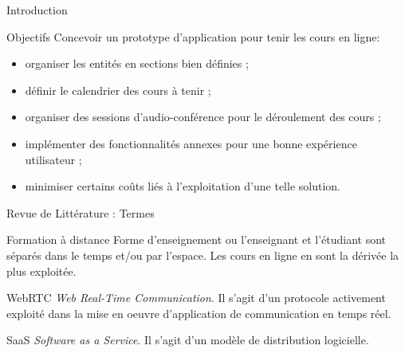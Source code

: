 \documentclass{beamer}
\begin{document}
\begin{frame}{Introduction}
  \begin{block}{Objectifs}
    Concevoir un prototype d'application pour tenir les cours en ligne:
    \begin{itemize}
      \item organiser les entités en sections bien définies ;
      \item définir le calendrier des cours à tenir ;
      \item organiser des sessions d’audio-conférence pour le déroulement des cours ;
      \item implémenter des fonctionnalités annexes pour une bonne expérience utilisateur ;
      \item minimiser certains coûts liés à l'exploitation d'une telle solution.
    \end{itemize}
  \end{block}
\end{frame}

\begin{frame}{Revue de Littérature : \small{Termes}}
  \begin{block}{Formation à distance}
    Forme d’enseignement ou l’enseignant et l’étudiant sont séparés dans le temps et/ou par l’espace.
    Les cours en ligne en sont la dérivée la plus exploitée.
  \end{block}
  \begin{block}{WebRTC}
    \textit{Web Real-Time Communication}. Il s'agit d'un protocole activement exploité dans la mise en oeuvre
    d'application de communication en temps réel.
  \end{block}
  \begin{block}{SaaS}
    \textit{Software as a Service}. Il s'agit d'un modèle de distribution logicielle.
  \end{block}
\end{frame}
\end{document}
